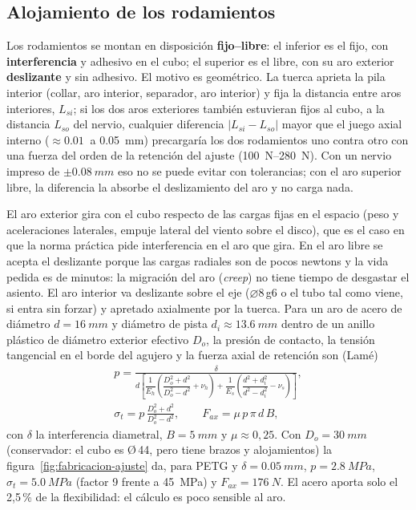 \subsection{Alojamiento de los rodamientos}\label{sec:fabricacion-ajuste}

Los rodamientos se montan en disposición \textbf{fijo--libre}: el inferior es el fijo,
con \textbf{interferencia} y adhesivo en el cubo; el superior es el libre, con su aro
exterior \textbf{deslizante} y sin adhesivo. El motivo es geométrico. La tuerca aprieta la
pila interior (collar, aro interior, separador, aro interior) y fija la distancia entre
aros interiores, $L_{si}$; si los dos aros exteriores también estuvieran fijos al cubo, a
la distancia $L_{so}$ del nervio, cualquier diferencia $|L_{si}-L_{so}|$ mayor que el juego
axial interno ($\approx\SI{0.01}{}$ a \SI{0.05}{mm}) precargaría los dos rodamientos uno
contra otro con una fuerza del orden de la retención del ajuste (\SIrange{100}{280}{N}). Con
un nervio impreso de $\pm\SI{0.08}{mm}$ eso no se puede evitar con tolerancias; con el aro
superior libre, la diferencia la absorbe el deslizamiento del aro y no carga nada.

El aro exterior gira con el cubo respecto de las cargas fijas en el espacio (peso y
aceleraciones laterales, empuje lateral del viento sobre el disco), que es el caso en que
la norma práctica pide interferencia en el aro que gira. En el aro libre se acepta el
deslizante porque las cargas radiales son de pocos newtons y la vida pedida es de
minutos: la migración del aro (\emph{creep}) no tiene tiempo de desgastar el asiento. El
aro interior va deslizante sobre el eje ($\varnothing8$\,g6 o el tubo tal como viene, si
entra sin forzar) y apretado axialmente por la tuerca. Para un aro de acero de diámetro
$d=\SI{16}{mm}$ y diámetro de pista $d_i\approx\SI{13.6}{mm}$ dentro de un anillo plástico de
diámetro exterior efectivo $D_o$, la presión de contacto, la tensión tangencial en el borde
del agujero y la fuerza axial de retención son (Lamé)
\begin{gather}
  p = \frac{\delta}{d\left[\dfrac{1}{E_h}\left(\dfrac{D_o^2+d^2}{D_o^2-d^2}+\nu_h\right)
      +\dfrac{1}{E_s}\left(\dfrac{d^2+d_i^2}{d^2-d_i^2}-\nu_s\right)\right]},
  \label{eq:fabricacion-lame}\\
  \sigma_t = p\,\frac{D_o^2+d^2}{D_o^2-d^2},\qquad F_{ax}=\mu\,p\,\pi\,d\,B,
  \nonumber
\end{gather}
con $\delta$ la interferencia diametral, $B=\SI{5}{mm}$ y $\mu\approx0{,}25$. Con
$D_o=\SI{30}{mm}$ (conservador: el cubo es Ø\,44, pero tiene brazos y alojamientos) la
figura~\ref{fig:fabricacion-ajuste} da, para PETG y $\delta=\SI{0.05}{mm}$,
$p=\SI{2.8}{MPa}$, $\sigma_t=\SI{5.0}{MPa}$ (factor 9 frente a \SI{45}{MPa}) y
$F_{ax}=\SI{176}{N}$. El acero aporta solo el 2,5\,\% de la flexibilidad: el cálculo es
poco sensible al aro.

